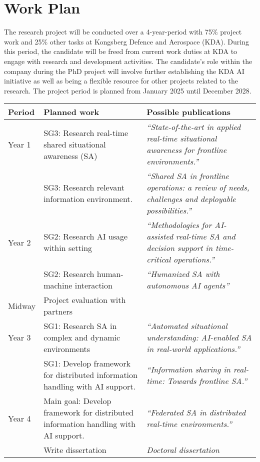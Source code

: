 \chapter{Work Plan}

The research project will be conducted over a 4-year-period with 75\% project work and 25\% other tasks at Kongsberg Defence and Aerospace (KDA). During this period, the candidate will be freed from current work duties at KDA to engage with research and development activities. The candidate’s role within the company during the PhD project will involve further establishing the KDA AI initiative as well as being a flexible resource for other projects related to the research. The project period is planned from January 2025 until December 2028.
\begin{center}
\begin{tabular}{|l|p{5cm}|p{5cm}|}
	\hline
	\cellcolor{blue!10}\textbf{Period} 
		& \cellcolor{blue!10}\textbf{Planned work} 
		& \cellcolor{blue!10}\textbf{Possible publications}\\
	\hline
	Year 1 
		& SG3: Research real-time shared situational awareness (SA) 
		& \textit{“State-of-the-art in applied real-time situational awareness for frontline environments.”}\\
	\cline{2-3}
		& SG3: Research relevant information environment. 
		& \textit{“Shared SA in frontline operations: a review of needs, 	challenges and deployable possibilities.”}\\
	\hline
	Year 2 
		& SG2: Research AI usage within setting
		& \textit{“Methodologies for AI-assisted real-time SA and decision support in time-critical operations.”}\\
	\cline{2-3}
		& SG2: Research human-machine interaction
		& \textit{“Humanized SA with autonomous AI agents”}\\
	\hline
	Midway & Project evaluation with partners &\\
	\hline
	Year 3 
		& SG1: Research SA in complex and dynamic environments
		& \textit{“Automated situational understanding: AI-enabled SA in real-world applications.”}\\
	\cline{2-3}
		& SG1: Develop framework for distributed information handling with AI support.
		& \textit{“Information sharing in real-time: Towards frontline SA.”}\\
	\hline
	Year 4 
		& Main goal: Develop framework for distributed information handling with AI support.
		& \textit{“Federated SA in distributed real-time environments.”}\\
	\cline{2-3}
		& Write dissertation
		& \textit{Doctoral dissertation}\\
	\hline
\end{tabular}\\
\end{center}

